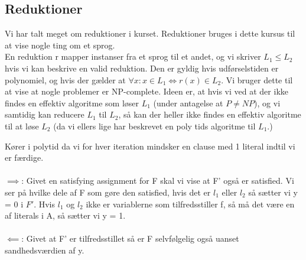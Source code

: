 \documentclass{article}
\begin{document}
\subsection{Reduktioner}
Vi har talt meget om reduktioner i kurset. Reduktioner bruges i dette kursus til at vise nogle ting om et sprog.\\
En reduktion r mapper instanser fra et sprog til et andet, og vi skriver $L_1 \le L_2$ hvis vi kan beskrive en valid reduktion. Den er gyldig hvis udførselstiden er polynomiel, og hvis der gælder at $\forall x: x\in L_1 \iff r(x)\in L_2$. Vi bruger dette til at vise at nogle problemer er NP-complete. Ideen er, at hvis vi ved at der ikke findes en effektiv algoritme som løser $L_1$ (under antagelse at $P\ne NP$), og vi samtidig kan reducere $L_1$ til $L_2$, så kan der heller ikke findes en effektiv algoritme til at løse $L_2$ (da vi ellers lige har beskrevet en poly tids algoritme til $L_1$.)

Kører i polytid da vi for hver iteration mindsker en clause med 1 literal indtil vi er færdige. \\\\
$\implies$: Givet en satisfying assignment for F skal vi vise at F' også er satisfied. Vi ser på hvilke dele af F som gøre den satisfied, hvis det er $l_1$ eller $l_2$ så sætter vi y = 0 i $F'$. Hvis $l_1$ og $l_2$ ikke er variablerne som tilfredsstiller f, så må det være en af literals i A, så sætter vi y = 1.\\\\
$\impliedby$: Givet at F' er tilfredsstillet så er F selvfølgelig også uanset sandhedsværdien af y.
\end{document}
